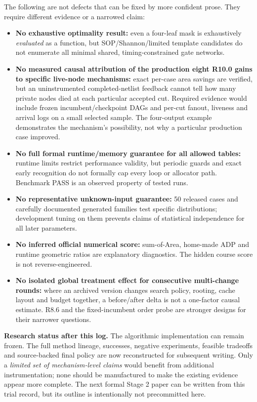The following are not defects that can be fixed by more confident prose. They require different evidence or a narrowed claim:

\begin{itemize}
\tightlist
\item
  \textbf{No exhaustive optimality result:} even a four-leaf mask is exhaustively \emph{evaluated} as a function, but SOP/Shannon/limited template candidates do not enumerate all minimal shared, timing-constrained gate networks.
\item
  \textbf{No measured causal attribution of the production eight R10.0 gains to specific live-node mechanisms:} exact per-case area savings are verified, but an uninstrumented completed-netlist feedback cannot tell how many private nodes died at each particular accepted cut. Required evidence would include frozen incumbent/checkpoint DAGs and per-cut fanout, liveness and arrival logs on a small selected sample. The four-output example demonstrates the mechanism's possibility, not why a particular production case improved.
\item
  \textbf{No full formal runtime/memory guarantee for all allowed tables:} runtime limits restrict performance validity, but periodic guards and exact early recognition do not formally cap every loop or allocator path. Benchmark PASS is an observed property of tested runs.
\item
  \textbf{No representative unknown-input guarantee:} 50 released cases and carefully documented generated families test specific distributions; development tuning on them prevents claims of statistical independence for all later parameters.
\item
  \textbf{No inferred official numerical score:} sum-of-Area, home-made ADP and runtime geometric ratios are explanatory diagnostics. The hidden course score is not reverse-engineered.
\item
  \textbf{No isolated global treatment effect for consecutive multi-change rounds:} where an archived version changes search policy, rooting, cache layout and budget together, a before/after delta is not a one-factor causal estimate. R8.6 and the fixed-incumbent order probe are stronger designs for their narrower questions.
\end{itemize}

\textbf{Research status after this log.} The algorithmic implementation can remain frozen. The full method lineage, successes, negative experiments, feasible tradeoffs and source-backed final policy are now reconstructed for subsequent writing. Only a \emph{limited set of mechanism-level claims} would benefit from additional instrumentation; none should be manufactured to make the existing evidence appear more complete. The next formal Stage 2 paper can be written from this trial record, but its outline is intentionally not precommitted here.

